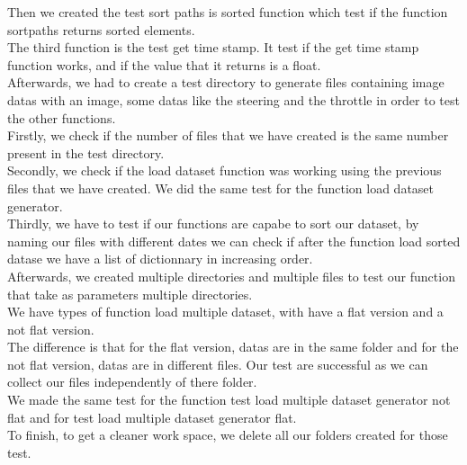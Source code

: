 \documentclass[12pt]{article}
\begin{document}
Then we created the test sort paths is sorted function which test if the function  sortpaths returns sorted elements. \\

The third function is the test get time stamp. It test if the get time stamp function works, and if the value that it returns is a float. \\


Afterwards, we had to create a test directory to generate files containing image datas with an image, some datas like the steering and the throttle in order to test the other functions. \\

Firstly, we check if the number of files that we have created  is the same number present in the test directory. \\

Secondly, we check if the load dataset function was working using the previous files that we have created. We did the same test for the function load dataset generator. \\

Thirdly, we have to test if our functions are capabe to sort our dataset, by naming our files with different dates we can check if after the function load sorted datase we have a list of dictionnary in increasing order. \\

Afterwards, we created multiple directories and multiple files to test our function that take as parameters multiple directories. \\

We have types of function load multiple dataset, with have a flat version and a not flat version. \\
The difference is that for the flat version, datas are in the same folder and for the not flat version, datas are in different files. Our test are successful as we can collect our files independently of there folder. \\

We made the same test for the function test load multiple dataset generator not flat and for test load multiple dataset generator flat. \\

To finish, to get a cleaner work space, we delete all our folders created for those test. \\

\end{document}
